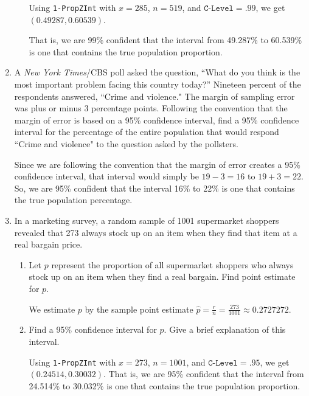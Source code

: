 \documentclass{article}
\newcommand{\answer}[1]{\color{white}#1}
\begin{document}
\begin{enumerate}
\begin{enumerate}
	{\answer Using \texttt{1-PropZInt} with $x=285$, $n=519$, and $\texttt{C-Level} = .99$, we get $(0.49287, 0.60539)$. 
	
	That is, we are 99\% confident that the interval from 49.287\% to 60.539\% is one that contains the true population proportion.
	} 
	\end{enumerate}

\item A {\em New York Times}/CBS poll asked the question, ``What do you think is the most important problem facing this country today?'' Nineteen percent of the respondents answered, ``Crime and violence." The margin of sampling error was plus or minus 3 percentage points. Following the convention that the margin of error is based on a 95\% confidence interval, find a 95\% confidence interval for the percentage of the entire population that would respond ``Crime and violence" to the question asked by the pollsters. 

{\answer Since we are following the convention that the margin of error creates a 95\% confidence interval, that interval would simply be $19-3= 16$ to $19+3=22$. So, we are 95\% confident that the interval 16\% to 22\% is one that contains the true population percentage.
} 

\vfill
\pagebreak

\item In a marketing survey, a random sample of 1001 supermarket shoppers revealed that 273 always stock up on an item when they find that item at a real bargain price. 
	\begin{enumerate}
	\item Let $p$ represent the proportion of all supermarket shoppers who always stock up on an item when they find a real bargain. Find point estimate for $p$. 
	
	{\answer We estimate $p$ by the sample point estimate $\hat{p} = \frac{r}{n} = \frac{273}{1001} \approx 0.2727272$.
	} 
	
	\item Find a 95\% confidence interval for $p$. Give a brief explanation of this interval. 
	
	{\answer Using \texttt{1-PropZInt} with $x=273$, $n=1001$, and $\texttt{C-Level} = .95$, we get $(0.24514, 0.30032)$.  
	That is, we are 95\% confident that the interval from 24.514\% to 30.032\% is one that contains the true population proportion.
	} 
	\end{enumerate}


\end{enumerate}
\end{document}
